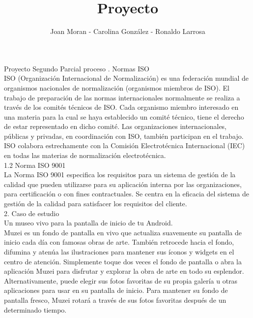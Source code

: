 \documentclass[12pt,a4paper]{article}
\author{Joan Moran - Carolina González - Ronaldo Larrosa}
\title{Proyecto}
\begin{document}
\maketitle Proyecto Segundo Parcial
proceso
.	Normas ISO\\
ISO (Organización Internacional de Normalización) es una federación mundial de organismos nacionales de normalización (organismos miembros de ISO). El trabajo de preparación de las normas internacionales normalmente se realiza a través de los comités técnicos de ISO. Cada organismo miembro interesado en una materia para la cual se haya establecido un comité técnico, tiene el derecho de estar representado en dicho comité. Las organizaciones internacionales, públicas y privadas, en coordinación con ISO, también participan en el trabajo. ISO colabora estrechamente con la Comisión Electrotécnica Internacional (IEC) en todas las materias de normalización electrotécnica.\\

1.2	Norma ISO 9001 \\

La Norma ISO 9001 especifica los requisitos para un sistema de gestión de la calidad que pueden utilizarse para su aplicación interna por las organizaciones, para certificación o con fines contractuales. Se centra en la eficacia del sistema de gestión de la calidad para satisfacer los requisitos del cliente.\\

2.	Caso de estudio\\
Un museo vivo para la pantalla de inicio de tu Android.\\
Muzei es un fondo de pantalla en vivo que actualiza suavemente su pantalla de inicio cada día con famosas obras de arte. También retrocede hacia el fondo, difumina y atenúa las ilustraciones para mantener sus íconos y widgets en el centro de atención. Simplemente toque dos veces el fondo de pantalla o abra la aplicación Muzei para disfrutar y explorar la obra de arte en todo su esplendor.\\

Alternativamente, puede elegir sus fotos favoritas de su propia galería u otras aplicaciones para usar en su pantalla de inicio. Para mantener su fondo de pantalla fresco, Muzei rotará a través de sus fotos favoritas después de un determinado tiempo.\\
\end{document}

